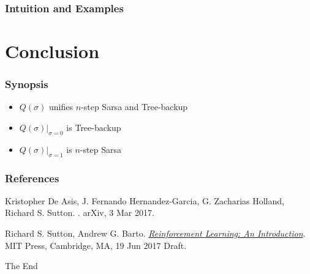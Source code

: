 \documentclass{beamer}
\begin{document}
\begin{frame}
  \frametitle{Intuition and Examples}
\end{frame}

\section{Conclusion}

\begin{frame}
\frametitle{Synopsis}
\begin{itemize}
    \item $Q(\sigma)$ unifies $n$-step Sarsa and Tree-backup
    \item $Q(\sigma)|_{\sigma=0}$ is Tree-backup
    \item $Q(\sigma)|_{\sigma=1}$ is $n$-step Sarsa
\end{itemize}
\end{frame}

\begin{frame}
  \frametitle<presentation>{References}

  \begin{thebibliography}{10}

  \beamertemplatebookbibitems

  \beamertemplatearticlebibitems

    Kristopher De Asis, J. Fernando Hernandez-Garcia, G. Zacharias Holland,
    Richard S. Sutton.
    .
    \newblock arXiv, 3 Mar 2017.

   Richard S. Sutton, Andrew G. Barto.  \newblock
    {\href{http://incompleteideas.net/sutton/book/the-book-2nd.html}{\em
      Reinforcement Learning: An Introduction}}.
    \newblock MIT Press, Cambridge, MA, 19 Jun 2017 Draft.

  \end{thebibliography}
\end{frame}


\begin{frame}
\Huge{\centerline{The End}}
\end{frame}

\end{document}
